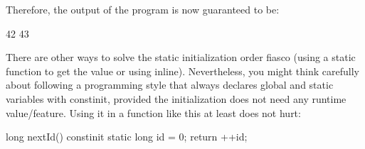 Therefore, the output of the program is now guaranteed to be:

\begin{shell}
42
43
\end{shell}

There are other ways to solve the static initialization order fiasco (using a static function to get the value or using inline). Nevertheless, you might think carefully about following a programming style that always declares global and static variables with constinit, provided the initialization does not need any runtime value/feature. Using it in a function like this at least does not hurt:

\begin{cpp}
long nextId()
{
	constinit static long id = 0;
	return ++id;
}
\end{cpp}









